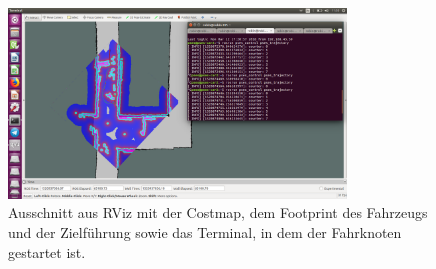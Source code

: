 \begin{figure}[h]
	\centering
	\includegraphics[width=0.8\textwidth,trim=2.4cm 0cm 0cm 1cm,clip]{pics/rviz.png}
	\caption{Ausschnitt aus RViz mit der Costmap, dem Footprint des Fahrzeugs und der Zielf\"uhrung sowie das Terminal, in dem der Fahrknoten gestartet ist.}
	\label{fig:rviz}
\end{figure}